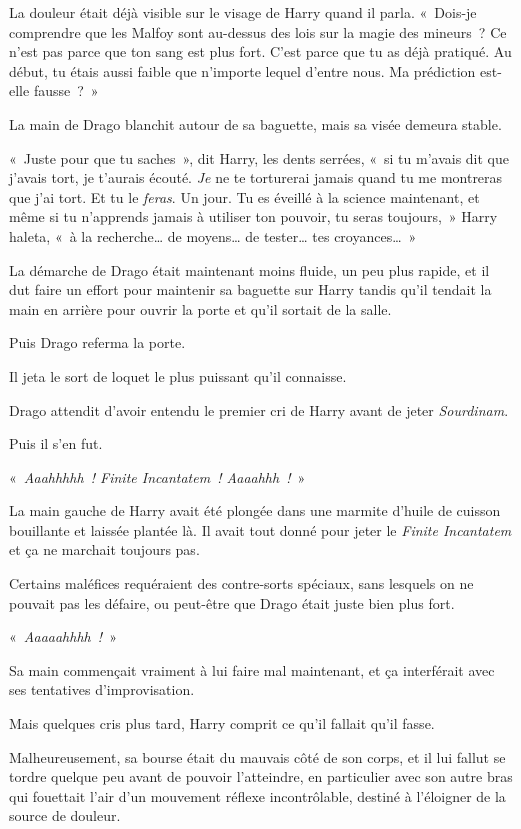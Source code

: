 La douleur était déjà visible sur le visage de Harry quand il parla. «~Dois-je comprendre que les Malfoy sont au-dessus des lois sur la magie des mineurs~? Ce n'est pas parce que ton sang est plus fort. C'est parce que tu as déjà pratiqué. Au début, tu étais aussi faible que n'importe lequel d'entre nous. Ma prédiction est-elle fausse~?~»

La main de Drago blanchit autour de sa baguette, mais sa visée demeura stable.

«~Juste pour que tu saches~», dit Harry, les dents serrées, «~si tu m'avais dit que j'avais tort, je t'aurais écouté. \emph{Je} ne te torturerai jamais quand tu me montreras que j'ai tort. Et tu le \emph{feras}. Un jour. Tu es éveillé à la science maintenant, et même si tu n'apprends jamais à utiliser ton pouvoir, tu seras toujours,~» Harry haleta, «~à la recherche… de moyens… de tester… tes croyances…~»

La démarche de Drago était maintenant moins fluide, un peu plus rapide, et il dut faire un effort pour maintenir sa baguette sur Harry tandis qu'il tendait la main en arrière pour ouvrir la porte et qu'il sortait de la salle.

Puis Drago referma la porte.

Il jeta le sort de loquet le plus puissant qu'il connaisse.

Drago attendit d'avoir entendu le premier cri de Harry avant de jeter \emph{Sourdinam}.

Puis il s'en fut.

\later

«~\emph{Aaahhhhh~! Finite Incantatem~! Aaaahhh~!}~»

La main gauche de Harry avait été plongée dans une marmite d'huile de cuisson bouillante et laissée plantée là. Il avait tout donné pour jeter le \emph{Finite Incantatem} et ça ne marchait toujours pas.

Certains maléfices requéraient des contre-sorts spéciaux, sans lesquels on ne pouvait pas les défaire, ou peut-être que Drago était juste bien plus fort.

«~\emph{Aaaaahhhh~!}~»

Sa main commençait vraiment à lui faire mal maintenant, et ça interférait avec ses tentatives d'improvisation.

Mais quelques cris plus tard, Harry comprit ce qu'il fallait qu'il fasse.

Malheureusement, sa bourse était du mauvais côté de son corps, et il lui fallut se tordre quelque peu avant de pouvoir l'atteindre, en particulier avec son autre bras qui fouettait l'air d'un mouvement réflexe incontrôlable, destiné à l'éloigner de la source de douleur.

